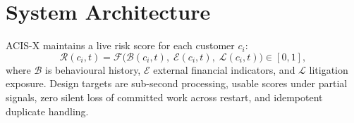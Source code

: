 \documentclass[conference]{IEEEtran}
\begin{document}
\section{System Architecture}
\label{sec:architecture}

ACIS-X maintains a live risk score for each customer $c_i$:
\begin{equation}
\mathcal{R}(c_i,t) = \mathcal{F}\bigl(\mathcal{B}(c_i,t),\;\mathcal{E}(c_i,t),\;\mathcal{L}(c_i,t)\bigr) \in [0,1],
\label{eq:risk}
\end{equation}
where $\mathcal{B}$ is behavioural history, $\mathcal{E}$ external financial indicators, and $\mathcal{L}$ litigation exposure. Design targets are sub-second processing, usable scores under partial signals, zero silent loss of committed work across restart, and idempotent duplicate handling.
\end{document}
